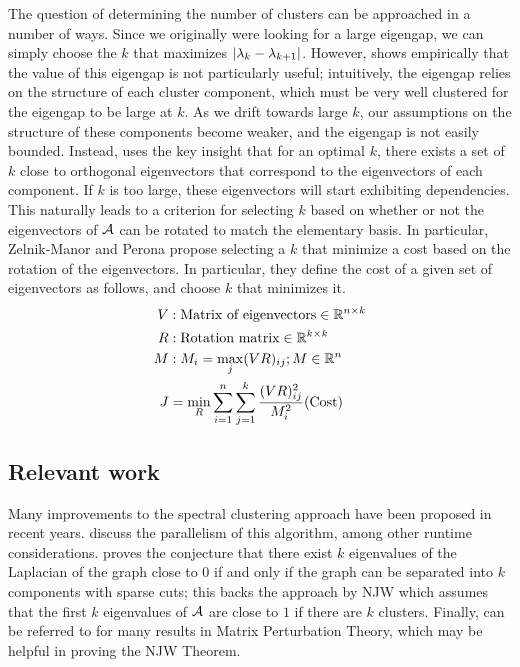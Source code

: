 The question of determining the number of clusters can be approached in a number
of ways. Since we originally were looking for a large eigengap, we can simply
choose the $k$ that maximizes $\lvert\lambda_k - \lambda_{k+1}\rvert$. However,
\cite{zelnik2004self} shows empirically that the value of this eigengap is not
particularly useful; intuitively, the eigengap relies on the structure of each
cluster component, which must be very well clustered for the eigengap to be
large at $k$. As we drift towards large $k$, our assumptions on the structure
of these components become weaker, and the eigengap is not easily bounded.
Instead, \cite{zelnik2004self} uses the key insight that for an optimal $k$,
there exists a set of $k$ close to orthogonal eigenvectors that correspond to
the eigenvectors of each component. If $k$ is too large, these eigenvectors
will start exhibiting dependencies. This naturally leads to a criterion for
selecting $k$ based on whether or not the eigenvectors of $\mathcal{A}$ can be rotated
to match the elementary basis. In particular, Zelnik-Manor and Perona propose
selecting a $k$ that minimize a cost based on the rotation of the eigenvectors.
In particular, they define the cost of a given set of eigenvectors as follows,
and choose $k$ that minimizes it.
\begin{align*}
    V&: \text{Matrix of eigenvectors} \in \mathbb{R}^{n \times k} \\
    R&: \text{Rotation matrix} \in \mathbb{R}^{k \times k} \\
    M&: M_{i} = \max_j (VR)_{ij}; M \in \mathbb{R}^{n}\\
    J &= \min_R \sum_{i=1}^n \sum_{j=1}^k \frac{(VR)_{ij}^2}{M_i^2} \text{(Cost)}\\
\end{align*}

\subsection{Relevant work}
Many improvements to the spectral clustering approach have been proposed in
recent years. \cite{song2008parallel} discuss the parallelism of this algorithm,
among other runtime considerations. \cite{lee2014multiway} proves the conjecture
that there exist $k$ eigenvalues of the Laplacian of the graph close to 0 if and
only if the graph can be separated into $k$ components with sparse cuts; this
backs the approach by NJW which assumes that the first $k$ eigenvalues of $\mathcal{A}$
are close to $1$ if there are $k$ clusters. Finally, \cite{stewart1990matrix}
can be referred to for many results in Matrix Perturbation Theory, which may
be helpful in proving the NJW Theorem.

